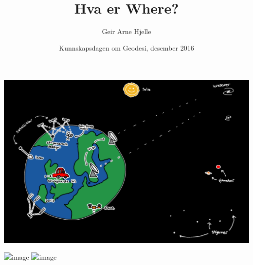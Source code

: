 \documentclass[12pt,table,t]{beamer}
\title{Hva er Where?}
\author{Geir Arne Hjelle}
\date{Kunnskapsdagen om Geodesi, desember 2016}
\begin{document}
\frame[plain]{\titlepage}

{
  \begin{frame}[c]{}
    \begin{center}
      \includegraphics[width=\textwidth]{figure/komplisert_verden}
    \end{center}
  \end{frame}
}

\begin{frame}[c]{}
  \begin{center}
    \includegraphics<1>[width=\textwidth]{figure/samle_data}
    \includegraphics<2>[width=\textwidth]{figure/where}
  \end{center}
\end{frame}
\end{document}
